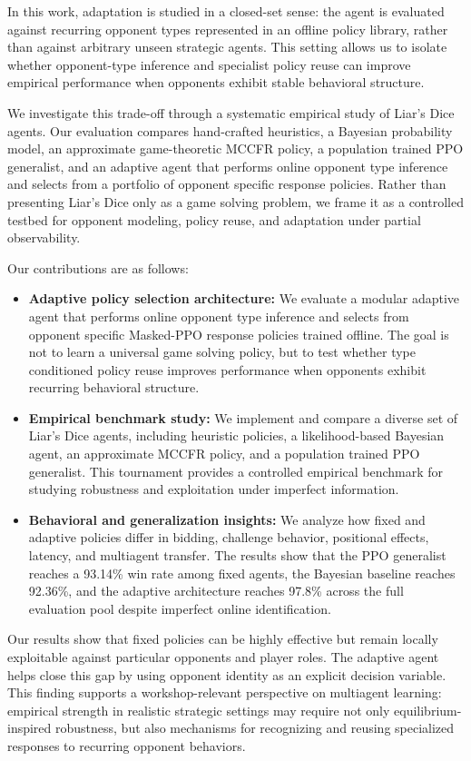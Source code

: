 \documentclass[letterpaper]{article} %
\begin{document}
In this work, adaptation is studied in a closed-set sense: the agent is evaluated against recurring opponent types represented in an offline policy library, rather than against arbitrary unseen strategic agents. This setting allows us to isolate whether opponent-type inference and specialist policy reuse can improve empirical performance when opponents exhibit stable behavioral structure.


We investigate this trade-off through a systematic empirical study of Liar’s Dice agents. Our evaluation compares hand-crafted heuristics, a Bayesian probability model, an approximate game-theoretic MCCFR policy, a population trained PPO generalist, and an adaptive agent that performs online opponent type inference and selects from a portfolio of opponent specific response policies. Rather than presenting Liar’s Dice only as a game solving problem, we frame it as a controlled testbed for opponent modeling, policy reuse, and adaptation under partial observability.

Our contributions are as follows:
\begin{itemize}

\item \textbf{Adaptive policy selection architecture:} We evaluate a modular adaptive agent that performs online opponent type inference and selects from opponent specific Masked-PPO response policies trained offline. The goal is not to learn a universal game solving policy, but to test whether type conditioned policy reuse improves performance when opponents exhibit recurring behavioral structure.


\item \textbf{Empirical benchmark study:} We implement and compare a diverse set of Liar's Dice agents, including heuristic policies, a likelihood-based Bayesian agent, an approximate MCCFR policy, and a population trained PPO generalist. This tournament provides a controlled empirical benchmark for studying robustness and exploitation under imperfect information.


\item \textbf{Behavioral and generalization insights:} We analyze how fixed and adaptive policies differ in bidding, challenge behavior, positional effects, latency, and multiagent transfer. The results show that the PPO generalist reaches a 93.14\% win rate among fixed agents, the Bayesian baseline reaches 92.36\%, and the adaptive architecture reaches 97.8\% across the full evaluation pool despite imperfect online identification.
\end{itemize}
Our results show that fixed policies can be highly effective but remain locally exploitable against particular opponents and player roles. The adaptive agent helps close this gap by using opponent identity as an explicit decision variable. This finding supports a workshop-relevant perspective on multiagent learning: empirical strength in realistic strategic settings may require not only equilibrium-inspired robustness, but also mechanisms for recognizing and reusing specialized responses to recurring opponent behaviors.
\end{document}
